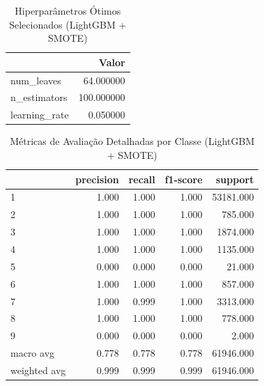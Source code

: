 \begin{table}[H]
\centering
\caption{Hiperparâmetros Ótimos Selecionados (LightGBM + SMOTE)}
\label{tab:lgbm_params}
\small
\begin{tabular}{lr}
\toprule
 & Valor \\
\midrule
num_leaves & 64.000000 \\
n_estimators & 100.000000 \\
learning_rate & 0.050000 \\
\bottomrule
\end{tabular}
\end{table}

\begin{table}[H]
\centering
\caption{Métricas de Avaliação Detalhadas por Classe (LightGBM + SMOTE)}
\label{tab:lgbm_metrics}
\small
\begin{tabular}{lrrrr}
\toprule
 & precision & recall & f1-score & support \\
\midrule
1 & 1.000 & 1.000 & 1.000 & 53181.000 \\
2 & 1.000 & 1.000 & 1.000 & 785.000 \\
3 & 1.000 & 1.000 & 1.000 & 1874.000 \\
4 & 1.000 & 1.000 & 1.000 & 1135.000 \\
5 & 0.000 & 0.000 & 0.000 & 21.000 \\
6 & 1.000 & 1.000 & 1.000 & 857.000 \\
7 & 1.000 & 0.999 & 1.000 & 3313.000 \\
8 & 1.000 & 1.000 & 1.000 & 778.000 \\
9 & 0.000 & 0.000 & 0.000 & 2.000 \\
macro avg & 0.778 & 0.778 & 0.778 & 61946.000 \\
weighted avg & 0.999 & 0.999 & 0.999 & 61946.000 \\
\bottomrule
\end{tabular}
\end{table}
